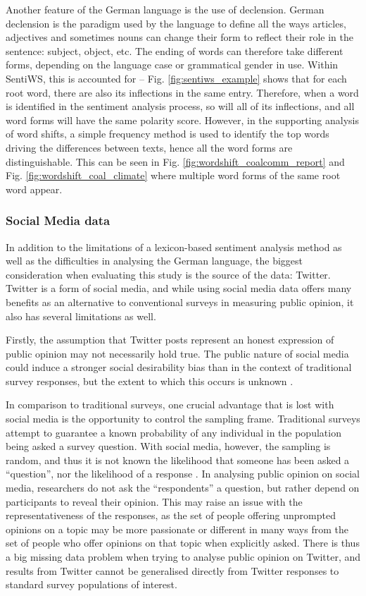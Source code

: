 \documentclass[12pt,onecolumn,twoside]{layout}
\begin{document}
Another feature of the German language is the use of declension. German declension is the paradigm used by the language to define all the ways articles, adjectives and sometimes nouns can change their form to reflect their role in the sentence: subject, object, etc. The ending of words can therefore take different forms, depending on the language case or grammatical gender in use. Within SentiWS, this is accounted for -- Fig. \ref{fig:sentiws_example} shows that for each root word, there are also its inflections in the same entry. Therefore, when a word is identified in the sentiment analysis process, so will all of its inflections, and all word forms will have the same polarity score. However, in the supporting analysis of word shifts, a simple frequency method is used to identify the top words driving the differences between texts, hence all the word forms are distinguishable. This can be seen in Fig. \ref{fig:wordshift_coalcomm_report} and Fig. \ref{fig:wordshift_coal_climate} where multiple word forms of the same root word appear.

\subsubsection*{Social Media data}
In addition to the limitations of a lexicon-based sentiment analysis method as well as the difficulties in analysing the German language, the biggest consideration when evaluating this study is the source of the data: Twitter. Twitter is a form of social media, and while using social media data offers many benefits as an alternative to conventional surveys in measuring public opinion, it also has several limitations as well.

Firstly, the assumption that Twitter posts represent an honest expression of public opinion may not necessarily hold true. The public nature of social media could induce a stronger social desirability bias than in the context of traditional survey responses, but the extent to which this occurs is unknown \citep{Klasnja2018}.

In comparison to traditional surveys, one crucial advantage that is lost with social media is the opportunity to control the sampling frame. Traditional surveys attempt to guarantee a known probability of any individual in the population being asked a survey question. With social media, however, the sampling is random, and thus it is not known the likelihood that someone has been asked a ``question'', nor the likelihood of a response \citep{Klasnja2018}. In analysing public opinion on social media, researchers do not ask the ``respondents'' a question, but rather depend on participants to reveal their opinion. This may raise an issue with the representativeness of the responses, as the set of people offering unprompted opinions on a topic may be more passionate or different in many ways from the set of people who offer opinions on that topic when explicitly asked. There is thus a big missing data problem when trying to analyse public opinion on Twitter, and results from Twitter cannot be generalised directly from Twitter responses to standard survey populations of interest.
\end{document}
